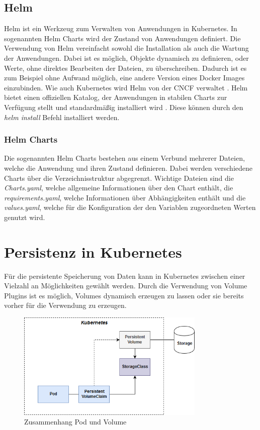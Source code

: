 \subsection{Helm}
Helm ist ein Werkzeug zum Verwalten von Anwendungen in Kubernetes. In sogenannten Helm Charts wird der Zustand von Anwendungen definiert. Die Verwendung von Helm vereinfacht sowohl die Installation als auch die Wartung der Anwendungen. Dabei ist es möglich, Objekte dynamisch zu definieren, oder Werte, ohne direktes Bearbeiten der Dateien, zu überschreiben. Dadurch ist es zum Beispiel ohne Aufwand möglich, eine andere Version eines Docker Images einzubinden. Wie auch Kubernetes wird Helm von der \ac{CNCF} verwaltet \cite{Helm}. Helm bietet einen offiziellen Katalog, der Anwendungen in stabilen Charts zur Verfügung stellt und standardmäßig installiert wird \cite{helm:github}. Diese können durch den \textit{helm install} Befehl installiert werden.

\subsubsection{Helm Charts}
\label{helm:chart}
Die sogenannten Helm Charts bestehen aus einem Verbund mehrerer Dateien, welche die Anwendung und ihren Zustand definieren. Dabei werden verschiedene Charts über die Verzeichnisstruktur abgegrenzt. Wichtige Dateien sind die \textit{Charts.yaml}, welche allgemeine Informationen über den Chart enthält, die \textit {requirements.yaml}, welche Informationen über Abhängigkeiten enthält und die \textit{values.yaml}, welche für die Konfiguration der den Variablen zugeordneten Werten genutzt wird.

\section{Persistenz in Kubernetes}
Für die persistente Speicherung von Daten kann in Kubernetes zwischen einer Vielzahl an Möglichkeiten gewählt werden. Durch die Verwendung von Volume Plugins ist es möglich, Volumes dynamisch erzeugen zu lassen oder sie bereits vorher für die Verwendung zu erzeugen. \medskip
\begin{figure}[htb]
\centering
\includegraphics[width=0.8\textwidth,angle=0]{gfx/kubevolumelifecycle}
\caption{Zusammenhang Pod und Volume}
\label{fig:kubevolumelifecycle}
\end{figure}


